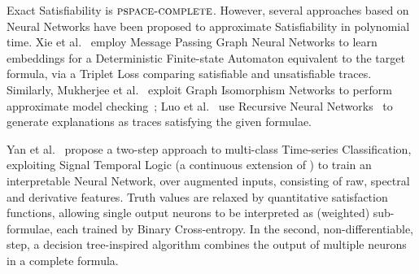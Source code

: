 Exact \LTL Satisfiability is $\textsc{pspace-complete}$. However, several approaches based on Neural Networks have been proposed to approximate Satisfiability in polynomial time. Xie et al.~\cite{xie2021embedding} employ Message Passing Graph Neural Networks to learn embeddings for a Deterministic Finite-state Automaton equivalent to the target \LTLf formula, via a Triplet Loss comparing satisfiable and unsatisfiable traces.
Similarly, Mukherjee et al.~\cite{mukherjee2022octal} exploit Graph Isomorphism Networks to perform approximate model checking~\cite{clarke2018introduction}; %
Luo et al.~\cite{luo2022checking,luo2024learning} use Recursive Neural Networks~\cite{socher2012semantic} to generate explanations as traces satisfying the given formulae. 

Yan et al.~\cite{yan2022neuro} propose a two-step approach to multi-class Time-series Classification, exploiting Signal Temporal Logic (a continuous extension of \LTL) to train an interpretable Neural Network, over augmented inputs, consisting of raw, spectral and derivative features. Truth values are relaxed by quantitative satisfaction functions, allowing single output neurons to be interpreted as (weighted) sub-formulae, each trained by Binary Cross-entropy. In the second, non-differentiable, step, a decision tree-inspired algorithm combines the output of multiple neurons in a complete formula. 

